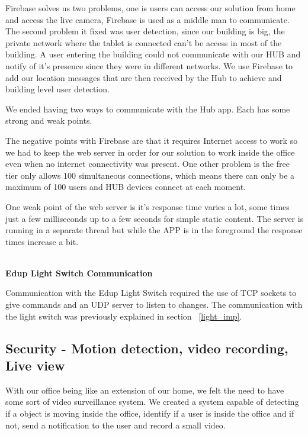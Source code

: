 Firebase solves us two problems, one is users can access our solution from home and access the live camera, Firebase is used as a middle man to communicate. The second problem it fixed was user detection, since our building is big, the private network where the tablet is connected can't be access in most of the building. A user entering the building could not communicate with our HUB and notify of it's presence since they were in different networks. We use Firebase to add our location messages that are then received by the Hub to achieve and building level user detection.

We ended having two ways to communicate with the Hub app. Each has some strong and weak points. 

The negative points with Firebase are that it requires Internet access to work so we had to keep the web server in order for our solution to work inside the office even when no internet connectivity was present. One other problem is the free tier only allows 100 simultaneous connections, which means there can only be a maximum of 100 users and HUB devices connect at each moment.

One weak point of the web server is it's response time varies a lot, some times just a few milliseconds up to a few seconds for simple static content. The server is running in a separate thread but while the APP is in the foreground the response times increase a bit.



\mbox{}\\
\textbf{Edup Light Switch Communication}

Communication with the Edup Light Switch required the use of TCP sockets to give commands and an UDP server to listen to changes. The communication with the light switch was previously explained in section ~\ref{light_imp}.



\subsection{Security - Motion detection, video recording, Live view}\label{imp:security_motion}

With our office being like an extension of our home, we felt the need to have some sort of video surveillance system. We created a system capable of detecting if a object is moving inside the office, identify if a user is inside the office and if not, send a notification to the user and record a small video.


